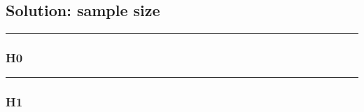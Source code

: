 \documentclass[]{article}
\begin{document}
\hypertarget{solution-sample-size}{%
\subsection{Solution: sample size}\label{solution-sample-size}}

\begin{center}\rule{0.5\linewidth}{\linethickness}\end{center}

\hypertarget{h0-2}{%
\subsubsection{H0}\label{h0-2}}

\begin{center}\rule{0.5\linewidth}{\linethickness}\end{center}

\hypertarget{h1-2}{%
\subsubsection{H1}\label{h1-2}}
\end{document}

